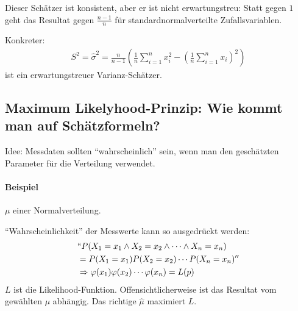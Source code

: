 \documentclass[10pt,a4paper]{scrartcl}
\begin{document}
Dieser Schätzer ist konsistent, aber er ist nicht erwartungstreu: Statt gegen $1$ geht das Resultat gegen $\frac{n-1}{n}$ für standardnormalverteilte Zufallsvariablen.

Konkreter: 
\begin{align*}
  S^2 = \hat{\sigma}^2 = \frac{n}{n-1} \left(\frac{1}{n} \sum_{i=1}^n x_i^2 - \left(\frac{1}{n} \sum_{i=1}^n x_i\right)^2 \right)
\end{align*}
ist ein erwartungstreuer Varianz-Schätzer.

\subsection{Maximum Likelyhood-Prinzip: Wie kommt man auf Schätzformeln?}

Idee: Messdaten sollten ``wahrscheinlich'' sein, wenn man den geschätzten Parameter für die Verteilung verwendet.

\paragraph{Beispiel} $\mu$ einer Normalverteilung.

``Wahrscheinlichkeit'' der Messwerte kann so ausgedrückt werden:
\begin{align*}
    &``P(X_1=x_1 \wedge X_2=x_2 \wedge \dots \wedge X_n=x_n) \\
    &= P(X_1=x_1)P(X_2=x_2)\cdots P(X_n=x_n)'' \\
    & \Rightarrow \varphi(x_1)\varphi(x_2)\cdots \varphi(x_n) = L(p)
\end{align*}
$L$ ist die Likelihood-Funktion. Offensichtlicherweise ist das Resultat vom gewählten $\mu$ abhängig. Das richtige $\hat{\mu}$ maximiert $L$. 
\end{document}

